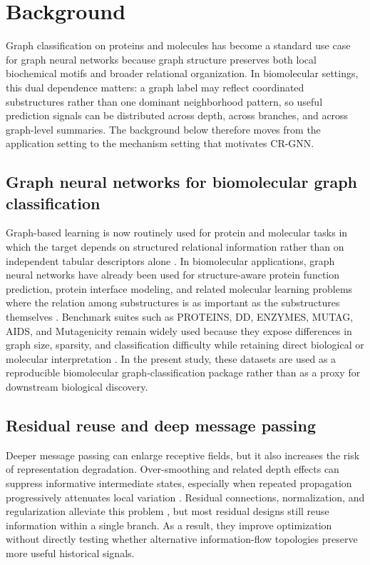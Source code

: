 \section*{Background}

Graph classification on proteins and molecules has become a standard use case for graph neural networks because graph structure preserves both local biochemical motifs and broader relational organization. In biomolecular settings, this dual dependence matters: a graph label may reflect coordinated substructures rather than one dominant neighborhood pattern, so useful prediction signals can be distributed across depth, across branches, and across graph-level summaries. The background below therefore moves from the application setting to the mechanism setting that motivates CR-GNN.

\subsection*{Graph neural networks for biomolecular graph classification}

Graph-based learning is now routinely used for protein and molecular tasks in which the target depends on structured relational information rather than on independent tabular descriptors alone \cite{kipf2016semi,gilmer2017neural,hamilton2017inductive}. In biomolecular applications, graph neural networks have already been used for structure-aware protein function prediction, protein interface modeling, and related molecular learning problems where the relation among substructures is as important as the substructures themselves \cite{gligorijevic2021structure,you2021deepgraphgo,reau2022deeprankgnn}. Benchmark suites such as PROTEINS, DD, ENZYMES, MUTAG, AIDS, and Mutagenicity remain widely used because they expose differences in graph size, sparsity, and classification difficulty while retaining direct biological or molecular interpretation \cite{fey2019fast,morris2020tudataset}. In the present study, these datasets are used as a reproducible biomolecular graph-classification package rather than as a proxy for downstream biological discovery.

\subsection*{Residual reuse and deep message passing}

Deeper message passing can enlarge receptive fields, but it also increases the risk of representation degradation. Over-smoothing and related depth effects can suppress informative intermediate states, especially when repeated propagation progressively attenuates local variation \cite{li2018deeper,oono2020simple,chen2023revisiting}. Residual connections, normalization, and regularization alleviate this problem \cite{he2016deep,bresson2017residual,zhao2020pair,cai2021graphnorm,rong2019dropedge}, but most residual designs still reuse information within a single branch. As a result, they improve optimization without directly testing whether alternative information-flow topologies preserve more useful historical signals.

